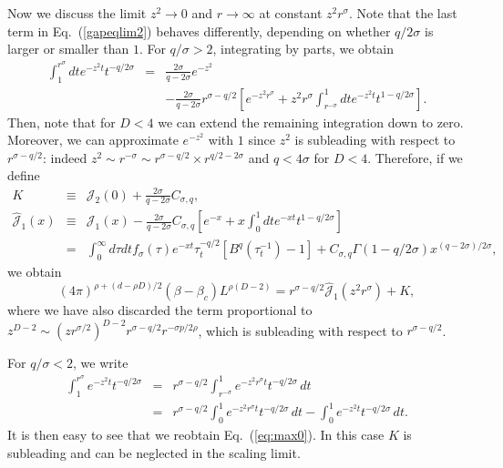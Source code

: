 \documentclass[a4paper,12pt]{article}
\begin{document}
{Now we discuss the limit $z^2\rightarrow 0$ and 
$r\rightarrow \infty$ at constant $z^2r^\sigma$. Note that the last
term in Eq.~(\ref{gapeqlim2}) behaves differently, depending on 
whether $q/2\sigma$ is larger or smaller than $1$. For $q/\sigma>2$,
integrating by parts, we obtain
\begin{eqnarray}
\int_1^{r^\sigma} dt e^{-z^2t}t^{-q/2\sigma} &= &
\frac{2\sigma}{q-2\sigma}e^{-z^2} \nonumber \\
&& -\frac{2\sigma}{q-2\sigma} r^{\sigma-q/2}\left[e^{-z^2r^\sigma} +
z^2r^\sigma\int_{r^{-\sigma}}^1 dt e^{-z^2t}t^{1-q/2\sigma} \right] .
\label{eq:max1}
\end{eqnarray}
Then, note that for $D<4$ we can extend the remaining integration down to 
zero. Moreover,  we can approximate $e^{-z^2}$ with $1$ since $z^2$ is 
subleading with respect to $r^{\sigma-q/2}$: indeed
$z^2\sim r^{-\sigma} \sim r^{\sigma-q/2}\times r^{q/2-2\sigma}$ and
$q<4\sigma$ for $D<4$.
Therefore, if we define
\begin{eqnarray}
K &\equiv & {\mathcal J}_2(0) + \frac{2\sigma}{q-2\sigma} C_{\sigma,q}, 
\label{def-K} \\
\widehat{\mathcal J}_1(x) &\equiv & {\mathcal J}_1(x) - 
\frac{2\sigma}{q-2\sigma} C_{\sigma,q} \left[e^{-x} + x \int_0^1 dt
e^{-xt} t^{1-q/2\sigma}\right]  \nonumber \\
&=& \int_0^\infty d\tau dt f_\sigma(\tau) e^{-xt}\tau_t^{-q/2}
[B^q(\tau_t^{-1})-1] + C_{\sigma,q}\Gamma(1-q/2\sigma) 
x^{(q-2\sigma)/2\sigma} ,
\label{defhatJ}
\end{eqnarray}
we obtain
\begin{equation}
(4\pi)^{\rho+(d-\rho D)/2} (\beta-\beta_c) 
L^{\rho(D-2)} = r^{\sigma-q/2} \widehat{\mathcal{J}}_1(z^2 r^\sigma) + K,
\label{eq:max0}
\end{equation}
where we have also discarded the term proportional to 
$z^{D-2} \sim (z r^{\sigma/2})^{D-2} r^{\sigma-q/2} r^{-\sigma p/2\rho }$,
which is subleading with respect to $r^{\sigma-q/2}$.

For $q/\sigma < 2$, we write
\begin{eqnarray}
\int_1^{r^\sigma} e^{-z^2 t} t^{-q/2\sigma} & = &
  r^{\sigma-q/2} \int^1_{r^{-\sigma}} e^{-z^2 r^\sigma t} t^{-q/2\sigma} \,dt 
\nonumber \\
    & = &  r^{\sigma-q/2} \int^1_{0} e^{-z^2 r^\sigma t} t^{-q/2\sigma} \,dt 
-  \int^1_{0} e^{-z^2 t} t^{-q/2\sigma} \,dt.
\label{eq:caso3}
\end{eqnarray}
It is then easy to see that we reobtain Eq.~(\ref{eq:max0}). In this case
$K$ is subleading and can be neglected in the scaling limit.

}
\end{document}
